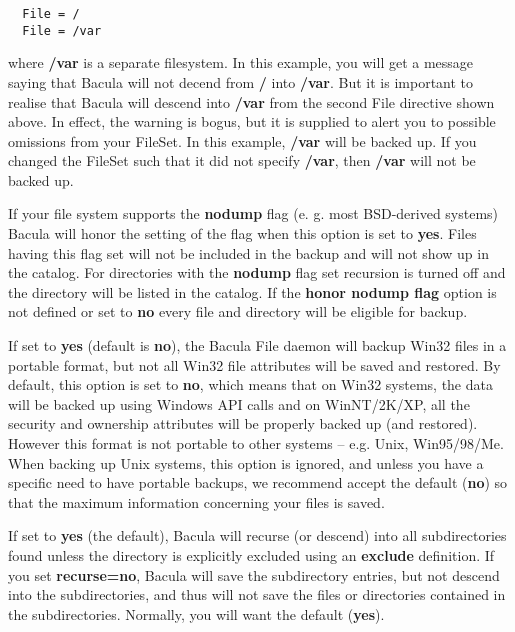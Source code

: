 \begin{description}
\footnotesize
\begin{verbatim}
  File = /
  File = /var
\end{verbatim}
\normalsize

   where {\bf /var} is a separate filesystem.  In this example, you will get a
   message saying that Bacula will not decend from {\bf /} into {\bf /var}.  But 
   it is important to realise that Bacula will descend into {\bf /var} from the 
   second File directive shown above.  In effect, the warning is bogus,
   but it is supplied to alert you to possible omissions from your FileSet. In 
   this example, {\bf /var} will be backed up.  If you changed the FileSet such 
   that it did not specify {\bf /var}, then {\bf /var} will not be backed up.

   
\item [honor nodump flag=\lt{}yes\vb{}no\gt{}]
        If your file system supports the {\bf nodump} flag (e. g. most
        BSD-derived systems) Bacula will honor the setting of the flag
        when this option is set to {\bf yes}. Files having this flag set
        will not be included in the backup and will not show up in the
        catalog. For directories with the {\bf nodump} flag set recursion
        is turned off and the directory will be listed in the catalog.
        If the {\bf honor nodump flag} option is not defined
        or set to {\bf no} every file and directory will be eligible for
        backup.


\label{portable}
\item [portable=yes\vb{}no]
   If set to {\bf yes} (default is {\bf no}), the Bacula File daemon will
   backup Win32 files in a portable format, but not all Win32 file
   attributes will be saved and restored.  By default, this option is set
   to {\bf no}, which means that on Win32 systems, the data will be backed
   up using Windows API calls and on WinNT/2K/XP, all the security and
   ownership attributes will be properly backed up (and restored).  However
   this format is not portable to other systems -- e.g.  Unix, Win95/98/Me.
   When backing up Unix systems, this option is ignored, and unless you
   have a specific need to have portable backups, we recommend accept the
   default ({\bf no}) so that the maximum information concerning your files
   is saved.

\item [recurse=yes\vb{}no]
   If set to {\bf yes} (the default), Bacula will recurse (or descend) into
   all subdirectories found unless the directory is explicitly excluded
   using an {\bf exclude} definition.  If you set {\bf recurse=no}, Bacula
   will save the subdirectory entries, but not descend into the
   subdirectories, and thus will not save the files or directories
   contained in the subdirectories.  Normally, you will want the default
   ({\bf yes}).


\end{description}
